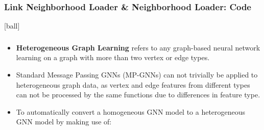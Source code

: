 \documentclass{beamer}
\begin{document}

\begin{frame}[fragile]
\frametitle{Link Neighborhood Loader \& Neighborhood Loader: Code}
[ball]



\end{frame}


\begin{frame}
\frametitle{}

\begin{minipage}[c]{0.8\textwidth}
    \hspace{1cm}
    
\end{minipage}

\end{frame}


\begin{frame}[fragile]
\begin{itemize}
\frametitle{Heterogeneous Graph Learning}
[ball]

\item \textbf{Heterogeneous Graph Learning} refers to any graph-based neural network learning on a graph with more than two vertex or edge types.

\vspace{0.3cm}

\item Standard Message Passing GNNs (MP-GNNs) can not trivially be applied to heterogeneous graph data, as vertex and edge features from different types can not be processed by the same functions due to differences in feature type.

\vspace{0.3cm}

\item To automatically convert a homogeneous GNN model to a heterogeneous GNN model by making use of:



\end{itemize}
\end{frame}
\end{document}
